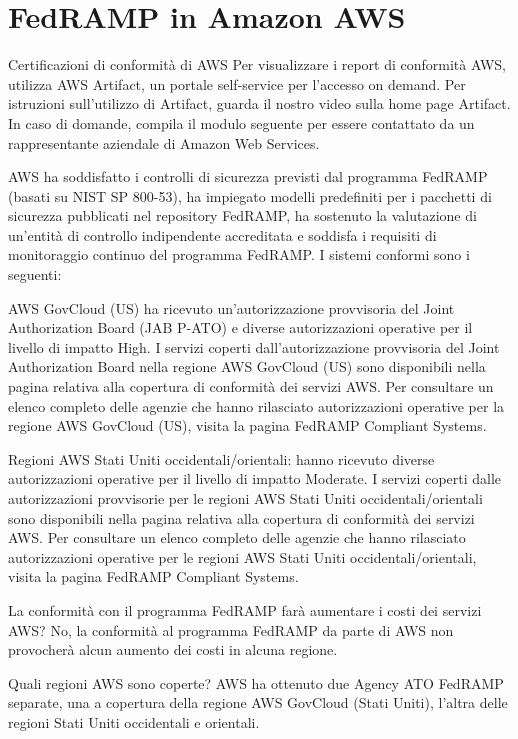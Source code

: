\documentclass[../main.tex]{subfiles}
\begin{document}
\section{FedRAMP in Amazon AWS}
Certificazioni di conformità di AWS
Per visualizzare i report di conformità AWS, utilizza AWS Artifact, un portale self-service per l’accesso on demand. Per istruzioni sull'utilizzo di Artifact, guarda il nostro video sulla home page Artifact. In caso di domande, compila il modulo seguente per essere contattato da un rappresentante aziendale di Amazon Web Services.

 AWS ha soddisfatto i controlli di sicurezza previsti dal programma FedRAMP (basati su NIST SP 800-53), ha impiegato modelli predefiniti per i pacchetti di sicurezza pubblicati nel repository FedRAMP, ha sostenuto la valutazione di un'entità di controllo indipendente accreditata e soddisfa i requisiti di monitoraggio continuo del programma FedRAMP. I sistemi conformi sono i seguenti:

AWS GovCloud (US) ha ricevuto un'autorizzazione provvisoria del Joint Authorization Board (JAB P-ATO) e diverse autorizzazioni operative per il livello di impatto High. I servizi coperti dall'autorizzazione provvisoria del Joint Authorization Board nella regione AWS GovCloud (US) sono disponibili nella pagina relativa alla copertura di conformità dei servizi AWS. Per consultare un elenco completo delle agenzie che hanno rilasciato autorizzazioni operative per la regione AWS GovCloud (US), visita la pagina FedRAMP Compliant Systems.

Regioni AWS Stati Uniti occidentali/orientali: hanno ricevuto diverse autorizzazioni operative per il livello di impatto Moderate. I servizi coperti dalle autorizzazioni provvisorie per le regioni AWS Stati Uniti occidentali/orientali sono disponibili nella pagina relativa alla copertura di conformità dei servizi AWS. Per consultare un elenco completo delle agenzie che hanno rilasciato autorizzazioni operative per le regioni AWS Stati Uniti occidentali/orientali, visita la pagina FedRAMP Compliant Systems.

La conformità con il programma FedRAMP farà aumentare i costi dei servizi AWS?
No, la conformità al programma FedRAMP da parte di AWS non provocherà alcun aumento dei costi in alcuna regione.

Quali regioni AWS sono coperte?
AWS ha ottenuto due Agency ATO FedRAMP separate, una a copertura della regione AWS GovCloud (Stati Uniti), l'altra delle regioni Stati Uniti occidentali e orientali.
\end{document}
